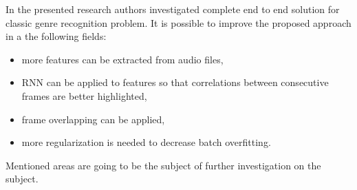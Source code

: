 In the presented research authors investigated complete end to end solution for classic genre recognition problem. It is possible to improve the proposed approach in a the following fields:
\begin{itemize}
 \item more features can be extracted from audio files,
 \item RNN can be applied to features so that correlations between consecutive frames are better highlighted,
 \item frame overlapping can be applied,
 \item more regularization is needed to decrease batch overfitting.
\end{itemize}
Mentioned areas are going to be the subject of further investigation on the subject.
